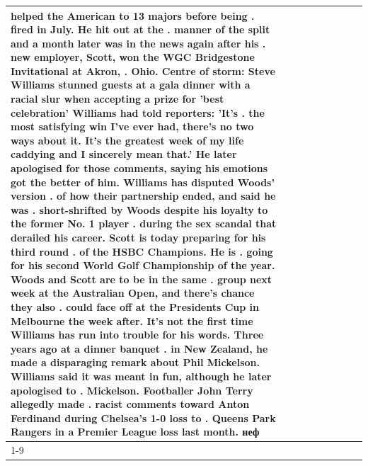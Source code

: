 \begin{table}[H]
\begin{tabular}{lllrlllll}
helped the American to 13 majors before being . fired in July. He hit out at the . manner of the split and a month later was in the news again after his . new employer, Scott, won the WGC Bridgestone Invitational at Akron, . Ohio. Centre of storm: Steve Williams stunned guests at a gala dinner with a racial slur when accepting a prize for 'best celebration' Williams had told reporters: 'It's . the most satisfying win I've ever had, there's no two ways about it. It's the greatest week of my life caddying and I sincerely mean that.' He later apologised for those comments, saying his emotions got the better of him. Williams has disputed Woods' version . of how their partnership ended, and said he was . short-shrifted by Woods despite his loyalty to the former No. 1 player . during the sex scandal that derailed his career. Scott is today preparing for his third round . of the HSBC Champions. He is . going for his second World Golf Championship of the year. Woods and Scott are to be in the same . group next week at the Australian Open, and there's chance they also . could face off at the Presidents Cup in Melbourne the week after. It's not the first time Williams has run into trouble for his words. Three years ago at a dinner banquet . in New Zealand, he made a disparaging remark about Phil Mickelson. Williams said it was meant in fun, although he later apologised to . Mickelson. Footballer John Terry allegedly made . racist comments toward Anton Ferdinand during Chelsea's 1-0 loss to . Queens Park Rangers in a Premier League loss last month. неф \\
\cline{1-9}

\end{tabular}
\end{table}
